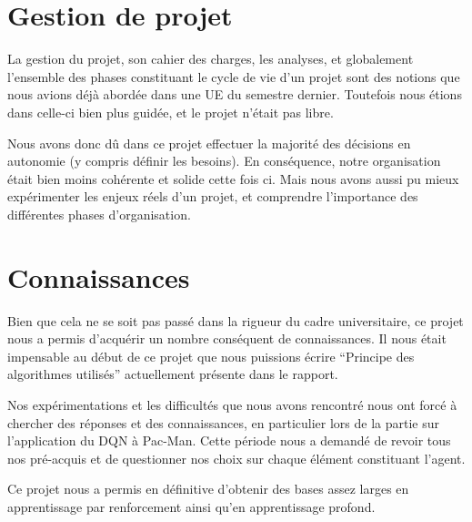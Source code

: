 \section{Gestion de projet}
La gestion du projet, son cahier des charges, les analyses, et globalement l'ensemble des phases constituant le cycle de vie d'un projet sont des notions que nous avions déjà abordée dans une UE du semestre dernier. Toutefois nous étions dans celle-ci bien plus guidée, et le projet n'était pas libre.
\par
Nous avons donc dû dans ce projet effectuer la majorité des décisions en autonomie (y compris définir les besoins). En conséquence, notre organisation était bien moins cohérente et solide cette fois ci. Mais nous avons aussi pu mieux expérimenter les enjeux réels d'un projet, et comprendre l'importance des différentes phases d'organisation.

\section{Connaissances}
Bien que cela ne se soit pas passé dans la rigueur du cadre universitaire, ce projet nous a permis d'acquérir un nombre conséquent de connaissances. Il nous était impensable au début de ce projet que nous puissions écrire ``Principe des algorithmes utilisés'' actuellement présente dans le rapport.
\par
Nos expérimentations et les difficultés que nous avons rencontré nous ont forcé à chercher des réponses et des connaissances, en particulier lors de la partie sur l'application du DQN à Pac-Man. Cette période nous a demandé de revoir tous nos pré-acquis et de questionner nos choix sur chaque élément constituant l'agent.
\par
Ce projet nous a permis en définitive d'obtenir des bases assez larges en apprentissage par renforcement ainsi qu'en apprentissage profond.
